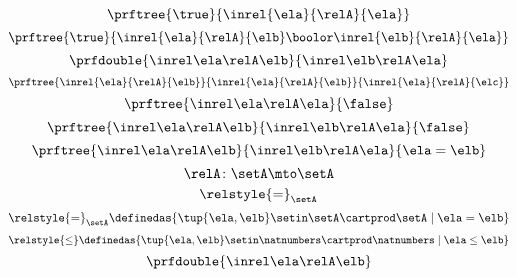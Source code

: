 \begin{forslides}
 \begin{equation}\label{eq:slides_session2_139}
\prftree{\true}{\inrel{\ela}{\relA}{\ela}}
\end{equation}
\begin{equation}\label{eq:slides_session2_140}
\prftree{\true}{\inrel{\ela}{\relA}{\elb} \boolor \inrel{\elb}{\relA}{\ela}}
\end{equation}
 \begin{equation}\label{eq:slides_session2_141}
\prfdouble{
            \inrel \ela \relA \elb
        }{
            \inrel \elb \relA \ela
        }
\end{equation}
\begin{equation}\label{eq:slides_session2_142}
\prftree{\inrel{\ela}{\relA}{\elb}}{\inrel{\ela}{\relA}{\elb}}{\inrel{\ela}{\relA}{\elc}}
\end{equation}
 \begin{equation}\label{eq:slides_session2_143}
\prftree{
            \inrel \ela \relA \ela
        }{
            \false
        }
\end{equation}
\begin{equation}\label{eq:slides_session2_144}
\prftree{
            \inrel \ela \relA \elb
        }{
            \inrel \elb \relA \ela
        }{
            \false
        } 
\end{equation}
 \begin{equation}\label{eq:slides_session2_145}
\prftree{
            \inrel \ela \relA \elb
        }{
            \inrel \elb \relA \ela
        }{
            \ela = \elb
        }  
\end{equation}
\begin{equation}\label{eq:slides_session2_146}
\relA\colon \setA \mto \setA
\end{equation}
 \begin{equation}\label{eq:slides_session2_147}
\relstyle{=}_\setA
\end{equation}
\begin{equation}\label{eq:slides_session2_148}
\relstyle{=}_\setA \definedas \{\tup{\ela,\elb}\setin \setA\cartprod \setA \mid \ela=\elb\}
\end{equation}
 \begin{equation}\label{eq:slides_session2_149}
\relstyle{\leq} \definedas  \{\tup{\ela,\elb}\setin \natnumbers\cartprod \natnumbers\mid \ela \leq \elb\}
\end{equation}
\begin{equation}\label{eq:slides_session2_150}
\prfdouble{
            \inrel \ela \relA \elb
}
\end{equation}
\end{forslides}
